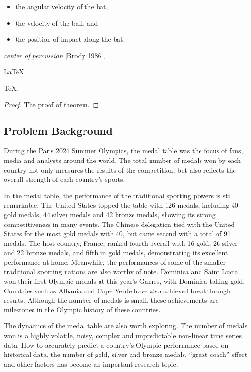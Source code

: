 \documentclass{mcmthesis}
\begin{document}
\lipsum[3]
\begin{itemize}
\item the angular velocity of the bat,
\item the velocity of the ball, and
\item the position of impact along the bat.
\end{itemize}
\lipsum[4]
\emph{center of percussion} [Brody 1986], \lipsum[5]
\begin{Theorem} \label{thm:latex}
\LaTeX
\end{Theorem}
\begin{Lemma} \label{thm:tex}
\TeX .
\end{Lemma}
\begin{proof}
The proof of theorem.
\end{proof}
\fi



\subsection{Problem Background}
During the Paris 2024 Summer Olympics, the medal table was the focus of fans, media and analysts around the world. The total number of medals won by each country not only measures the results of the competition, but also reflects the overall strength of each country's sports.

In the medal table, the performance of the traditional sporting powers is still remarkable. The United States topped the table with 126 medals, including 40 gold medals, 44 silver medals and 42 bronze medals, showing its strong competitiveness in many events. The Chinese delegation tied with the United States for the most gold medals with 40, but came second with a total of 91 medals. The host country, France, ranked fourth overall with 16 gold, 26 silver and 22 bronze medals, and fifth in gold medals, demonstrating its excellent performance at home.
Meanwhile, the performances of some of the smaller traditional sporting nations are also worthy of note. Dominica and Saint Lucia won their first Olympic medals at this year's Games, with Dominica taking gold. Countries such as Albania and Cape Verde have also achieved breakthrough results. Although the number of medals is small, these achievements are milestones in the Olympic history of these countries.

The dynamics of the medal table are also worth exploring. The number of medals won is a highly volatile, noisy, complex and unpredictable non-linear time series data. How to accurately predict a country's Olympic performance based on historical data, the number of gold, silver and bronze medals, “great coach” effect and other factors has become an important research topic.
\end{document}
